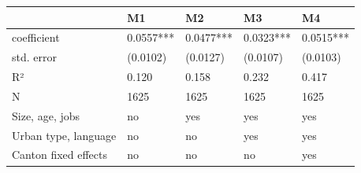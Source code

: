 \begin{tabular}{lllll}
\toprule
 & M1 & M2 & M3 & M4 \\
\midrule
coefficient & 0.0557*** & 0.0477*** & 0.0323*** & 0.0515*** \\
std. error & (0.0102) & (0.0127) & (0.0107) & (0.0103) \\
R² & 0.120 & 0.158 & 0.232 & 0.417 \\
N & 1625 & 1625 & 1625 & 1625 \\
Size, age, jobs & no & yes & yes & yes \\
Urban type, language & no & no & yes & yes \\
Canton fixed effects & no & no & no & yes \\
\bottomrule
\end{tabular}
